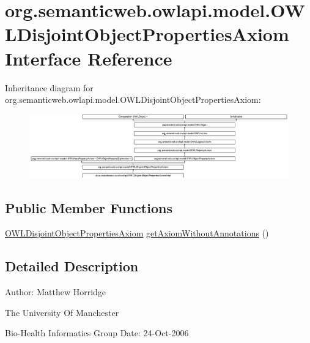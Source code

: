 \hypertarget{interfaceorg_1_1semanticweb_1_1owlapi_1_1model_1_1_o_w_l_disjoint_object_properties_axiom}{\section{org.\-semanticweb.\-owlapi.\-model.\-O\-W\-L\-Disjoint\-Object\-Properties\-Axiom Interface Reference}
\label{interfaceorg_1_1semanticweb_1_1owlapi_1_1model_1_1_o_w_l_disjoint_object_properties_axiom}
}
Inheritance diagram for org.\-semanticweb.\-owlapi.\-model.\-O\-W\-L\-Disjoint\-Object\-Properties\-Axiom\-:\begin{figure}[H]
\begin{center}
\leavevmode
\includegraphics[height=2.750154cm]{interfaceorg_1_1semanticweb_1_1owlapi_1_1model_1_1_o_w_l_disjoint_object_properties_axiom}
\end{center}
\end{figure}
\subsection*{Public Member Functions}
\begin{DoxyCompactItemize}
\item 
\hyperlink{interfaceorg_1_1semanticweb_1_1owlapi_1_1model_1_1_o_w_l_disjoint_object_properties_axiom}{O\-W\-L\-Disjoint\-Object\-Properties\-Axiom} \hyperlink{interfaceorg_1_1semanticweb_1_1owlapi_1_1model_1_1_o_w_l_disjoint_object_properties_axiom_ab892ec944845ecdfb1fcdb2712512fc0}{get\-Axiom\-Without\-Annotations} ()
\end{DoxyCompactItemize}


\subsection{Detailed Description}
Author\-: Matthew Horridge\par
 The University Of Manchester\par
 Bio-\/\-Health Informatics Group Date\-: 24-\/\-Oct-\/2006 

